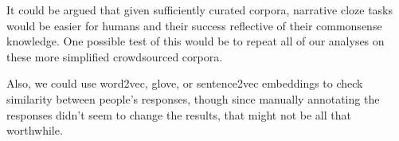 \documentclass[10pt,a4paper]{article}
\newcommand{\todo}[1]{{\color{red}#1}}
\begin{document}
It could be argued that given sufficiently curated corpora, narrative cloze tasks would be easier for humans and their success reflective of their commonsense knowledge. One possible test of this would be to repeat all of our analyses on these more simplified crowdsourced corpora.

\todo{Also, we could use word2vec, glove, or sentence2vec embeddings to check similarity between people's responses, though since manually annotating the responses didn't seem to change the results, that might not be all that worthwhile.}





\setlength{\bibleftmargin}{.125in}
\setlength{\bibindent}{-\bibleftmargin}


\end{document}
